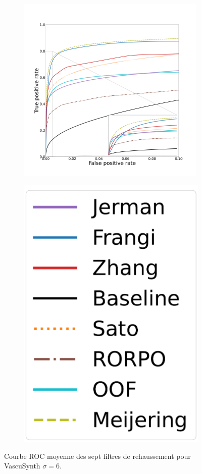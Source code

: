 \begin{figure}[H]
  \begin{subfigure}[t]{0.78\textwidth}
    \centering
    \includegraphics[clip = true, trim  =  125 125 100 200, height=9cm]{Images/Vascu_6_ROC.pdf}
\end{subfigure}
\begin{subfigure}[t]{0.2\textwidth}
  \includegraphics[width=\textwidth,clip = true]{Images/standAloneLegend.pdf}
\end{subfigure}
\caption{Courbe ROC moyenne des sept filtres de rehaussement pour VascuSynth $\sigma=6$.}
  \label{fig:Vascu6_ROC}
\end{figure}

